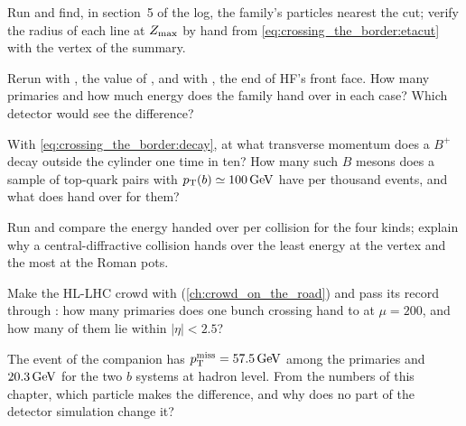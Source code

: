\begin{exercises}
\item Run  and find, in section~5 of the log, the
  family's particles nearest the cut; verify the radius of each line at
  $Z_{\max}$ by hand from \cref{eq:crossing_the_border:etacut} with the vertex of
  the summary.
\item Rerun with , the value of
  , and with , the end of HF's
  front face. How many primaries and how much energy does the family hand
  over in each case? Which detector would see the difference?
\item With \cref{eq:crossing_the_border:decay}, at what transverse momentum
  does a $B^+$ decay outside the cylinder one time in ten? How many such $B$
  mesons does a sample of top-quark pairs with $p_{\mathrm{T}}(b)\simeq100\,\mathrm{GeV}$ have
  per thousand events, and what does  hand over for
  them?
\item Run  and compare the energy handed over per
  collision for the four kinds; explain why a central-diffractive collision
  hands over the least energy at the vertex and the most at the Roman pots.
\item Make the HL-LHC crowd with  (\cref{ch:crowd_on_the_road}) and pass its record through
  : how many primaries does one bunch crossing hand
  to \GEANT at $\mu=200$, and how many of them lie within $|\eta|<2.5$?
\item The \CMSSW event of the companion has $p_{\mathrm{T}}^{\mathrm{miss}}=57.5\,\mathrm{GeV}$
  among the primaries and $20.3\,\mathrm{GeV}$ for the two $b$ systems at hadron
  level. From the numbers of this chapter, which particle makes the
  difference, and why does no part of the detector simulation change it?
\end{exercises}

